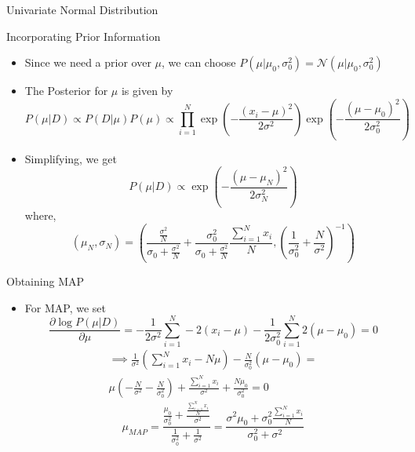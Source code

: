 \documentclass{beamer}
\begin{document}
\begin{section}{Univariate Normal Distribution}
    \begin{frame}{Incorporating Prior Information}
        \begin{itemize}
            \item Since we need a prior over $\mu$, we can choose $P (\mu | \mu_0, \sigma_0^2) = \mathcal{N} (\mu | \mu_0, \sigma_0^2)$
            \pause
            \item The Posterior for $\mu$ is given by
            $$
            P (\mu | D) \propto P (D | \mu) P (\mu) \propto \prod_{i = 1}^{N} \exp \left( - \frac{(x_i - \mu)^2}{2 \sigma^2} \right) \exp \left( - \frac{(\mu - \mu_0)^2}{2 \sigma_0^2} \right)
            $$
            \pause
            \item Simplifying, we get
            $$
            P (\mu | D) \propto \exp \left( - \frac{(\mu - \mu_N)^2}{2 \sigma_N^2} \right)
            $$
            where,
            $$
            (\mu_N, \sigma_N) = \left(\frac{\frac{\sigma^2}{N}}{\sigma_0 + \frac{\sigma^2}{N}} + \frac{\sigma_0^2}{\sigma_0 + \frac{\sigma^2}{N}} \frac{\sum_{i = 1}^{N} x_i}{N}, \left( \frac{1}{\sigma_0^2} + \frac{N}{\sigma^2} \right)^{-1} \right)
            $$
        \end{itemize}
    \end{frame}

    \begin{frame}{Obtaining MAP}
        \begin{itemize}
            \item For MAP, we set
            $$
            \frac{\partial \log P (\mu | D)}{\partial \mu} = - \frac{1}{2 \sigma^2} \sum_{i = 1}^{N} -2 (x_i - \mu) - \frac{1}{2 \sigma_0^2} \sum_{i = 1}^{N} 2 (\mu - \mu_0) = 0
            $$
            \pause
            \begin{align*}
                \implies \frac{1}{\sigma^2} (\sum_{i = 1}^{N} x_i - N \mu) - \frac{N}{\sigma_0^2} (\mu - \mu_0) = \\ \mu \left( - \frac{N}{\sigma^2} - \frac{N}{\sigma_0^2} \right) + \frac{\sum_{i = 1}^{N} x_i}{\sigma^2} + \frac{N \mu_0}{\sigma_0^2} = 0                
            \end{align*}
            \pause
            $$
            \mu_{MAP} = \frac{\frac{\mu_0}{\sigma_0^2} + \frac{\frac{\sum_{i = 1}^{N} x_i}{N}}{\sigma^2}}{\frac{1}{\sigma_0^2} + \frac{1}{\sigma^2}} = \frac{\sigma^2 \mu_0 + \sigma_0^2 \frac{\sum_{i = 1}^{N} x_i}{N}}{\sigma_0^2 + \sigma^2}
            $$
        \end{itemize}
    \end{frame}


\end{section}
\end{document}
